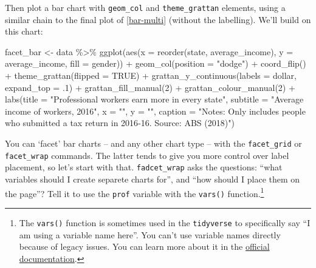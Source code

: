 \documentclass[
]{book}
\newenvironment{Shaded}{\begin{snugshade}}{\end{snugshade}}
\newcommand{\AttributeTok}[1]{\textcolor[rgb]{0.77,0.63,0.00}{#1}}
\newcommand{\ConstantTok}[1]{\textcolor[rgb]{0.00,0.00,0.00}{#1}}
\newcommand{\DecValTok}[1]{\textcolor[rgb]{0.00,0.00,0.81}{#1}}
\newcommand{\FunctionTok}[1]{\textcolor[rgb]{0.00,0.00,0.00}{#1}}
\newcommand{\NormalTok}[1]{#1}
\newcommand{\OtherTok}[1]{\textcolor[rgb]{0.56,0.35,0.01}{#1}}
\newcommand{\SpecialCharTok}[1]{\textcolor[rgb]{0.00,0.00,0.00}{#1}}
\newcommand{\StringTok}[1]{\textcolor[rgb]{0.31,0.60,0.02}{#1}}
\begin{document}
Then plot a bar chart with \texttt{geom\_col} and \texttt{theme\_grattan} elements, using a similar chain to the final plot of \ref{bar-multi} (without the labelling). We'll build on this chart:

\begin{Shaded}
\begin{Highlighting}[]
\NormalTok{facet\_bar }\OtherTok{\textless{}{-}}\NormalTok{ data }\SpecialCharTok{\%\textgreater{}\%} 
  \FunctionTok{ggplot}\NormalTok{(}\FunctionTok{aes}\NormalTok{(}\AttributeTok{x =} \FunctionTok{reorder}\NormalTok{(state, average\_income),}
             \AttributeTok{y =}\NormalTok{ average\_income,}
             \AttributeTok{fill =}\NormalTok{ gender)) }\SpecialCharTok{+} 
  \FunctionTok{geom\_col}\NormalTok{(}\AttributeTok{position =} \StringTok{"dodge"}\NormalTok{) }\SpecialCharTok{+} 
  \FunctionTok{coord\_flip}\NormalTok{() }\SpecialCharTok{+} 
  \FunctionTok{theme\_grattan}\NormalTok{(}\AttributeTok{flipped =} \ConstantTok{TRUE}\NormalTok{) }\SpecialCharTok{+} 
  \FunctionTok{grattan\_y\_continuous}\NormalTok{(}\AttributeTok{labels =}\NormalTok{ dollar, }
                       \AttributeTok{expand\_top =}\NormalTok{ .}\DecValTok{1}\NormalTok{) }\SpecialCharTok{+} 
  \FunctionTok{grattan\_fill\_manual}\NormalTok{(}\DecValTok{2}\NormalTok{) }\SpecialCharTok{+} 
  \FunctionTok{grattan\_colour\_manual}\NormalTok{(}\DecValTok{2}\NormalTok{) }\SpecialCharTok{+} 
  \FunctionTok{labs}\NormalTok{(}\AttributeTok{title =} \StringTok{"Professional workers earn more in every state"}\NormalTok{,}
       \AttributeTok{subtitle =} \StringTok{"Average income of workers, 2016"}\NormalTok{,}
       \AttributeTok{x =} \StringTok{""}\NormalTok{,}
       \AttributeTok{y =} \StringTok{""}\NormalTok{,}
       \AttributeTok{caption =} \StringTok{"Notes: Only includes people who submitted a tax return in 2016{-}16. Source: ABS (2018)"}\NormalTok{)}
\end{Highlighting}
\end{Shaded}

You can `facet' bar charts -- and any other chart type -- with the \texttt{facet\_grid} or \texttt{facet\_wrap} commands. The latter tends to give you more control over label placement, so let's start with that. \texttt{fadcet\_wrap} asks the questions: ``what variables should I create separete charts for'', and ``how should I place them on the page''? Tell it to use the \texttt{prof} variable with the \texttt{vars()} function.\footnote{The \texttt{vars()} function is sometimes used in the \texttt{tidyverse} to specifically say ``I am using a variable name here''. You can't use variable names directly because of legacy issues. You can learn more about it in the \href{https://ggplot2.tidyverse.org/reference/facet_wrap.html}{official documentation}.}
\end{document}
